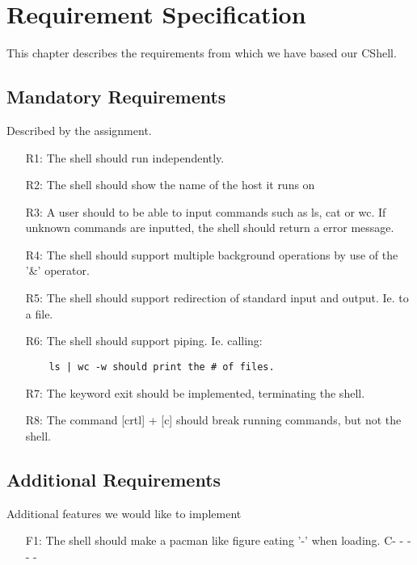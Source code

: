 \chapter{Requirement Specification}
This chapter describes the requirements from which we have based our CShell.

\section{Mandatory Requirements}
Described by the assignment.

\begin{itemize}[leftmargin=25mm]

\item[R1:] The shell should run independently.
\item[R2:] The shell should show the name of the host it runs on
\item[R3:] A user should to be able to input commands such as ls, cat or wc. If unknown commands are inputted, the shell should return a error message.
\item[R4:] The shell should support multiple background operations by use of the '\&' operator.
\item[R5:] The shell should support redirection of standard input and output. Ie. to a file.
\item[R6:] The shell should support piping. Ie. calling: \begin{verbatim}
	ls | wc -w should print the # of files.
\end{verbatim}
\item[R7:] The keyword exit should be implemented, terminating the shell.
\item[R8:] The command [crtl] + [c] should break running commands, but not the shell.

\end{itemize}

\section{Additional Requirements}
Additional features we would like to implement

\begin{itemize}[leftmargin=25mm]

\item[F1:] The shell should make a pacman like figure eating '-' when loading.
 C- - - - -

\end{itemize}